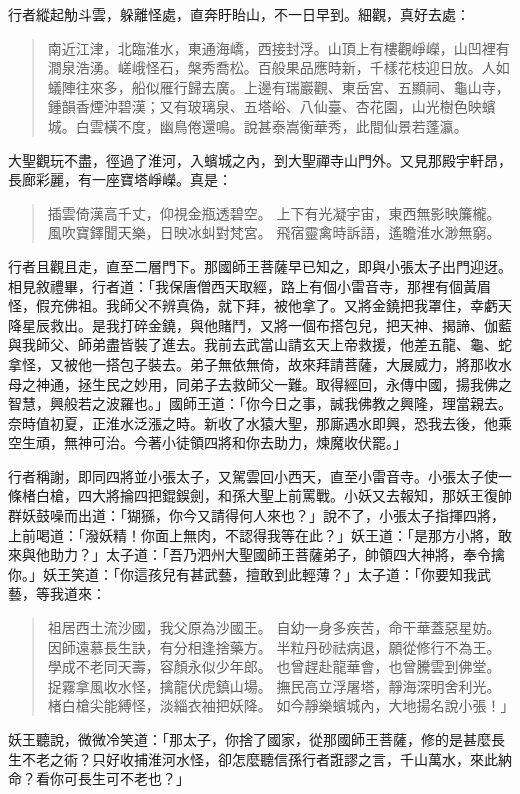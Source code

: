 行者縱起觔斗雲，躲離怪處，直奔盱眙山，不一日早到。細觀，真好去處：
\begin{quote}
南近江津，北臨淮水，東通海嶠，西接封浮。山頂上有樓觀崢嶸，山凹裡有澗泉浩湧。嵯峨怪石，槃秀喬松。百般果品應時新，千樣花枝迎日放。人如蟻陣往來多，船似雁行歸去廣。上邊有瑞巖觀、東岳宮、五顯祠、龜山寺，鍾韻香煙沖碧漢；又有玻璃泉、五塔峪、八仙臺、杏花園，山光樹色映蠙城。白雲橫不度，幽鳥倦還鳴。說甚泰嵩衡華秀，此間仙景若蓬瀛。
\end{quote}

大聖觀玩不盡，徑過了淮河，入蠙城之內，到大聖禪寺山門外。又見那殿宇軒昂，長廊彩麗，有一座寶塔崢嶸。真是：
\begin{quote}
插雲倚漢高千丈，仰視金瓶透碧空。
上下有光凝宇宙，東西無影映簾櫳。
風吹寶鐸聞天樂，日映冰虯對梵宮。
飛宿靈禽時訴語，遙瞻淮水渺無窮。
\end{quote}

行者且觀且走，直至二層門下。那國師王菩薩早已知之，即與小張太子出門迎迓。相見敘禮畢，行者道：「我保唐僧西天取經，路上有個小雷音寺，那裡有個黃眉怪，假充佛祖。我師父不辨真偽，就下拜，被他拿了。又將金鐃把我罩住，幸虧天降星辰救出。是我打碎金鐃，與他賭鬥，又將一個布搭包兒，把天神、揭諦、伽藍與我師父、師弟盡皆裝了進去。我前去武當山請玄天上帝救援，他差五龍、龜、蛇拿怪，又被他一搭包子裝去。弟子無依無倚，故來拜請菩薩，大展威力，將那收水母之神通，拯生民之妙用，同弟子去救師父一難。取得經回，永傳中國，揚我佛之智慧，興般若之波羅也。」國師王道：「你今日之事，誠我佛教之興隆，理當親去。奈時值初夏，正淮水泛漲之時。新收了水猿大聖，那廝遇水即興，恐我去後，他乘空生頑，無神可治。今著小徒領四將和你去助力，煉魔收伏罷。」

行者稱謝，即同四將並小張太子，又駕雲回小西天，直至小雷音寺。小張太子使一條楮白槍，四大將掄四把錕鋘劍，和孫大聖上前罵戰。小妖又去報知，那妖王復帥群妖鼓噪而出道：「猢猻，你今又請得何人來也？」說不了，小張太子指揮四將，上前喝道：「潑妖精！你面上無肉，不認得我等在此？」妖王道：「是那方小將，敢來與他助力？」太子道：「吾乃泗州大聖國師王菩薩弟子，帥領四大神將，奉令擒你。」妖王笑道：「你這孩兒有甚武藝，擅敢到此輕薄？」太子道：「你要知我武藝，等我道來：
\begin{quote}
祖居西土流沙國，我父原為沙國王。
自幼一身多疾苦，命干華蓋惡星妨。
因師遠慕長生訣，有分相逢捨藥方。
半粒丹砂祛病退，願從修行不為王。
學成不老同天壽，容顏永似少年郎。
也曾趕赴龍華會，也曾騰雲到佛堂。
捉霧拿風收水怪，擒龍伏虎鎮山場。
撫民高立浮屠塔，靜海深明舍利光。
楮白槍尖能縛怪，淡緇衣袖把妖降。
如今靜樂蠙城內，大地揚名說小張！」
\end{quote}

妖王聽說，微微冷笑道：「那太子，你捨了國家，從那國師王菩薩，修的是甚麼長生不老之術？只好收捕淮河水怪，卻怎麼聽信孫行者誑謬之言，千山萬水，來此納命？看你可長生可不老也？」

